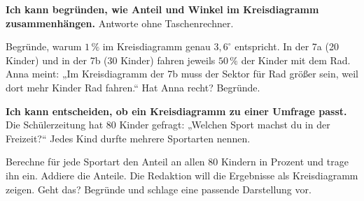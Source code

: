 \begin{aufgabe}{\textbf{Ich kann begründen, wie Anteil und Winkel im Kreisdiagramm zusammenhängen.} Antworte ohne Taschenrechner.}
\begin{teile}
\teil Begründe, warum $1\,\%$ im Kreisdiagramm genau $3{,}6^\circ$ entspricht.
\teil In der 7a (20 Kinder) und in der 7b (30 Kinder) fahren jeweils $50\,\%$ der Kinder mit dem Rad. Anna meint: „Im Kreisdiagramm der 7b muss der Sektor für Rad größer sein, weil dort mehr Kinder Rad fahren.“ Hat Anna recht? Begründe.
\end{teile}
\end{aufgabe}

\begin{aufgabe}{\textbf{Ich kann entscheiden, ob ein Kreisdiagramm zu einer Umfrage passt.} Die Schülerzeitung hat 80 Kinder gefragt: „Welchen Sport machst du in der Freizeit?“ Jedes Kind durfte mehrere Sportarten nennen.}


\begin{teile}
\teil Berechne für jede Sportart den Anteil an allen 80 Kindern in Prozent und trage ihn ein.
\teil Addiere die Anteile. \leerfeld[\%]
\teil Die Redaktion will die Ergebnisse als Kreisdiagramm zeigen. Geht das? Begründe und schlage eine passende Darstellung vor.
\end{teile}
\end{aufgabe}
